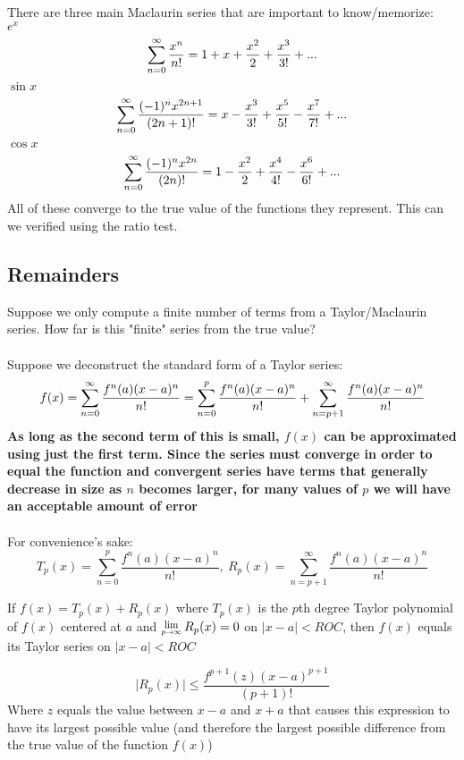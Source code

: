 \documentclass[12 pt]{article}
\begin{document}
		There are three main Maclaurin series that are important to know/memorize:\\
		\textbf{$e^x$}
		$$\sum\limits_{n=0}^{\infty} \frac{x^n}{n!}=1+x+\frac{x^2}{2}+\frac{x^3}{3!}+...$$
		\textbf{$\sin{x}$}
		$$\sum\limits_{n=0}^{\infty} \frac{(-1)^nx^{2n+1}}{(2n+1)!}=x-\frac{x^3}{3!}+\frac{x^5}{5!}-\frac{x^7}{7!}+...$$
		\textbf{$\cos{x}$}
		$$\sum\limits_{n=0}^{\infty} \frac{(-1)^nx^{2n}}{(2n)!}=1-\frac{x^2}{2}+\frac{x^4}{4!}-\frac{x^6}{6!}+...$$
		All of these converge to the true value of the functions they represent. This can we verified using the ratio test.

		\subsection{Remainders}

		Suppose we only compute a finite number of terms from a Taylor/Maclaurin series. How far is this "finite" series from the true value?\\\\
		Suppose we deconstruct the standard form of a Taylor series:
		$$f(x)=\sum\limits_{n=0}^{\infty} \frac{f^n(a)(x-a)^n}{n!}=\sum_{n=0}^p \frac{f^n(a)(x-a)^n}{n!}+\sum_{n=p+1}^{\infty} \frac{f^n(a)(x-a)^n}{n!}$$
		\textbf{As long as the second term of this is small, $f(x)$ can be approximated using just the first term. Since the series must converge in order to equal the function and convergent series have terms that generally decrease in size as $n$ becomes larger, for many values of $p$ we will have an acceptable amount of error}\\\\

		For convenience's sake:
		$$T_p(x)=\sum_{n=0}^p \frac{f^n(a)(x-a)^n}{n!},\ R_p(x)=\sum_{n=p+1}^{\infty} \frac{f^n(a)(x-a)^n}{n!}$$

		\begin{thrm} If $f(x)=T_p(x)+R_p(x)$ where $T_p(x)$ is the $p$th degree Taylor polynomial of $f(x)$ centered at $a$ and $\Lim{p\toinfty} R_p(x)=0$ on $\lvert x-a\rvert<ROC$, then $f(x)$ equals its Taylor series on $\lvert x-a\rvert<ROC$
		\end{thrm}

		\begin{thrm}$$\lvert R_p(x)\rvert\leq \frac{f^{p+1}(z)(x-a)^{p+1}}{(p+1)!}$$
			Where $z$ equals the value between $x-a$ and $x+a$ that causes this expression to have its largest possible value (and therefore the largest possible difference from the true value of the function $f(x)$)
		\end{thrm}
\end{document}
